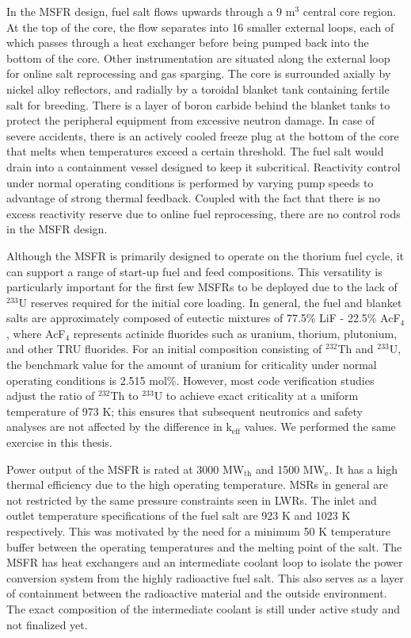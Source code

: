 In the \gls{MSFR} design, fuel salt flows upwards through a 9 m$^3$ central
core region. At the top of the core, the flow separates into 16 smaller
external loops, each of which passes through a heat exchanger before being
pumped back into the bottom of the core. Other instrumentation are situated
along the external loop for online salt reprocessing and gas sparging. The
core is surrounded axially by nickel alloy reflectors, and radially by a
toroidal blanket tank containing fertile salt for breeding. There is a layer
of boron carbide behind the blanket tanks to protect the peripheral equipment
from excessive neutron damage. In case of severe accidents, there is an
actively cooled freeze plug at the bottom of the core that melts when
temperatures exceed a certain threshold. The fuel salt would drain into a
containment vessel designed to keep it subcritical. Reactivity control under
normal operating conditions is performed by varying pump speeds to advantage
of strong thermal feedback. Coupled with the fact that there is no excess
reactivity reserve due to online fuel reprocessing, there are no control rods
in the \gls{MSFR} design.

Although the \gls{MSFR} is primarily designed to operate on the thorium fuel
cycle, it can support a range of start-up fuel and feed compositions. This
versatility is particularly important for the first few \glspl{MSFR} to be
deployed due to the lack of $^{233}$U reserves required for the initial core
loading. In general, the fuel and blanket salts are approximately composed of
eutectic mixtures of 77.5\% LiF - 22.5\% AcF$_4$, where AcF$_4$ represents
actinide fluorides such as uranium, thorium, plutonium, and other \gls{TRU}
fluorides. For an initial composition consisting of $^{232}$Th and $^{233}$U,
the benchmark value for the amount of uranium for criticality under
normal operating conditions is 2.515 mol\%. However, most code verification
studies adjust the ratio of $^{232}$Th to $^{233}$U to achieve exact
criticality at a uniform temperature of 973 K; this ensures that subsequent
neutronics and safety analyses are not affected by the difference in
k$_{\text{eff}}$ values. We performed the same exercise in this thesis.

Power output of the \gls{MSFR} is rated at 3000 MW$_{\text{th}}$ and 1500
MW$_{\text{e}}$. It has a high thermal efficiency due to the high operating
temperature. \glspl{MSR} in general are not restricted by the same pressure
constraints seen in \glspl{LWR}. The inlet and outlet temperature
specifications of the fuel salt are 923 K and 1023 K respectively. This was
motivated by the need for a minimum 50 K temperature buffer between the
operating temperatures and the melting point of the salt. The \gls{MSFR} has
heat exchangers and an intermediate coolant loop to isolate the power
conversion system from the highly radioactive fuel salt. This also serves as
a layer of containment between the radioactive material and the outside
environment. The exact composition of the intermediate coolant is still under
active study and not finalized yet.

